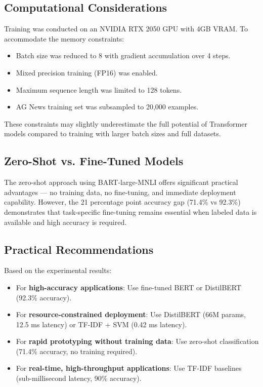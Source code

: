 \documentclass[12pt, a4paper]{article}
\begin{document}
\subsection{Computational Considerations}
Training was conducted on an NVIDIA RTX 2050 GPU with 4GB VRAM. To accommodate the memory constraints:
\begin{itemize}
    \item Batch size was reduced to 8 with gradient accumulation over 4 steps.
    \item Mixed precision training (FP16) was enabled.
    \item Maximum sequence length was limited to 128 tokens.
    \item AG News training set was subsampled to 20,000 examples.
\end{itemize}

These constraints may slightly underestimate the full potential of Transformer models compared to training with larger batch sizes and full datasets.

\subsection{Zero-Shot vs. Fine-Tuned Models}
The zero-shot approach using BART-large-MNLI offers significant practical advantages --- no training data, no fine-tuning, and immediate deployment capability. However, the 21 percentage point accuracy gap (71.4\% vs 92.3\%) demonstrates that task-specific fine-tuning remains essential when labeled data is available and high accuracy is required.

\subsection{Practical Recommendations}
Based on the experimental results:
\begin{itemize}
    \item For \textbf{high-accuracy applications}: Use fine-tuned BERT or DistilBERT (92.3\% accuracy).
    \item For \textbf{resource-constrained deployment}: Use DistilBERT (66M params, 12.5 ms latency) or TF-IDF + SVM (0.42 ms latency).
    \item For \textbf{rapid prototyping without training data}: Use zero-shot classification (71.4\% accuracy, no training required).
    \item For \textbf{real-time, high-throughput applications}: Use TF-IDF baselines (sub-millisecond latency, 90\% accuracy).
\end{itemize}
\end{document}
